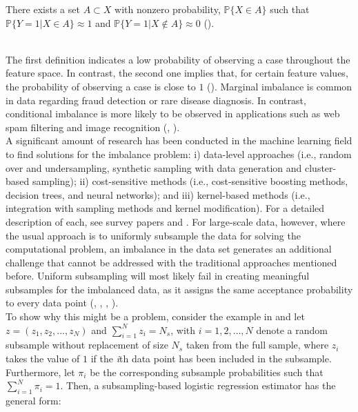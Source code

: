 \begin{definition}
There exists a set $A \subset X$ with nonzero probability, $\mathbb{P}\{X \in A\}$ such that $\mathbb{P}\{Y=1|X \in A\} \approx 1$ and $\mathbb{P}\{Y=1|X \notin A\} \approx 0$ (\cite{obrien2019}). 
\end{definition}\\


The first definition indicates a low probability of observing a case throughout the feature space. In contrast, the second one implies that, for certain feature values, the probability of observing a case is close to $1$ (\cite{obrien2019}). Marginal imbalance is common in data regarding fraud detection or rare disease diagnosis. In contrast, conditional imbalance is more likely to be observed in applications such as web spam filtering and image recognition (\cite{hastie2014},  \cite{han2020local}). \\

A significant amount of research has been conducted in the machine learning field to find solutions for the imbalance problem: i) data-level approaches (i.e., random over and undersampling, synthetic sampling with data generation and cluster-based sampling); ii) cost-sensitive methods (i.e., cost-sensitive boosting methods, decision trees, and neural networks); and iii) kernel-based methods (i.e., integration with sampling methods and kernel modification). For a detailed description of each, see survey papers \textcite{he2019} and \textcite{chawla2014editorial}. For large-scale data, however, where the usual approach is to uniformly subsample the data for solving the computational problem, an imbalance in the data set generates an additional challenge that cannot be addressed with the traditional approaches mentioned before. Uniform subsampling will most likely fail in creating meaningful subsamples for the imbalanced data, as it assigns the same acceptance probability to every data point (\cite{han2020local}, \cite{wang2020rare}, \cite{yao2021review}, \cite{hastie2014}). \\

To show why this might be a problem, consider the example in \textcite{cheng2020} and let $z=(z_1, z_2, ..., z_N)$ and $\sum_{i=1}^{N}z_i=N_s$, with $i=1,2, \dots, N$ denote a random subsample without replacement of size $N_s$ taken from the full sample, where $z_i$ takes the value of $1$ if the \textit{i}th data point has been included in the subsample. Furthermore, let $\pi_i$ be the corresponding subsample probabilities such that $\sum_{i=1}^{N} \pi_i = 1$. Then, a subsampling-based logistic regression estimator has the general form: 

